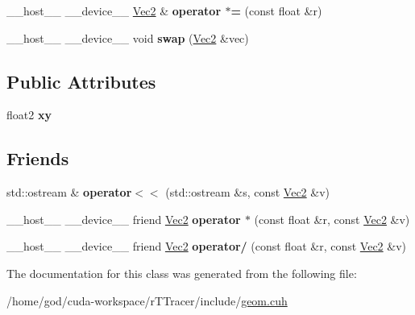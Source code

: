 \begin{DoxyCompactItemize}
\item 
\+\_\+\+\_\+host\+\_\+\+\_\+ \+\_\+\+\_\+device\+\_\+\+\_\+ \hyperlink{class_vec2}{Vec2} \& {\bfseries operator $\ast$=} (const float \&r)\hypertarget{class_vec2_ab7f2a84b847c04690ddd7823144ae591}{}\label{class_vec2_ab7f2a84b847c04690ddd7823144ae591}

\item 
\+\_\+\+\_\+host\+\_\+\+\_\+ \+\_\+\+\_\+device\+\_\+\+\_\+ void {\bfseries swap} (\hyperlink{class_vec2}{Vec2} \&vec)\hypertarget{class_vec2_a45e2ef0b091128f3d78fc691b862cdef}{}\label{class_vec2_a45e2ef0b091128f3d78fc691b862cdef}

\end{DoxyCompactItemize}
\subsection*{Public Attributes}
\begin{DoxyCompactItemize}
\item 
float2 {\bfseries xy}\hypertarget{class_vec2_ae166edaf1b05eb0634e8ceb08adf1cc3}{}\label{class_vec2_ae166edaf1b05eb0634e8ceb08adf1cc3}

\end{DoxyCompactItemize}
\subsection*{Friends}
\begin{DoxyCompactItemize}
\item 
std\+::ostream \& {\bfseries operator$<$$<$} (std\+::ostream \&s, const \hyperlink{class_vec2}{Vec2} \&v)\hypertarget{class_vec2_a694960aa6f1e1475c532ec7682f39287}{}\label{class_vec2_a694960aa6f1e1475c532ec7682f39287}

\item 
\+\_\+\+\_\+host\+\_\+\+\_\+ \+\_\+\+\_\+device\+\_\+\+\_\+ friend \hyperlink{class_vec2}{Vec2} {\bfseries operator $\ast$} (const float \&r, const \hyperlink{class_vec2}{Vec2} \&v)\hypertarget{class_vec2_a85b03ac25ec19d9bb9b746474b443d17}{}\label{class_vec2_a85b03ac25ec19d9bb9b746474b443d17}

\item 
\+\_\+\+\_\+host\+\_\+\+\_\+ \+\_\+\+\_\+device\+\_\+\+\_\+ friend \hyperlink{class_vec2}{Vec2} {\bfseries operator/} (const float \&r, const \hyperlink{class_vec2}{Vec2} \&v)\hypertarget{class_vec2_ae7585370defee85ee50ac0ccb82f5e49}{}\label{class_vec2_ae7585370defee85ee50ac0ccb82f5e49}

\end{DoxyCompactItemize}


The documentation for this class was generated from the following file\+:\begin{DoxyCompactItemize}
\item 
/home/god/cuda-\/workspace/r\+T\+Tracer/include/\hyperlink{geom_8cuh}{geom.\+cuh}\end{DoxyCompactItemize}
